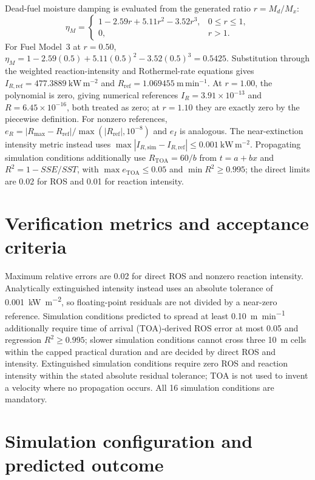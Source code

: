 Dead-fuel moisture damping is evaluated from the generated ratio
\(r=M_d/M_x\):
\[
 \eta_M=\begin{cases}
 1-2.59r+5.11r^2-3.52r^3,&0\leq r\leq1,\\
 0,&r>1.
 \end{cases}
\]
For Fuel Model~3 at \(r=0.50\),
\(\eta_M=1-2.59(0.5)+5.11(0.5)^2-3.52(0.5)^3=0.5425\).
Substitution through the weighted reaction-intensity and Rothermel-rate
equations gives
\(I_{R,\mathrm{ref}}=477.3889~\mathrm{kW\,m^{-2}}\) and
\(R_{\mathrm{ref}}=1.069455~\mathrm{m\,min^{-1}}\).
At \(r=1.00\), the polynomial is zero, giving numerical references
\(I_R=3.91\times10^{-13}\) and
\(R=6.45\times10^{-16}\), both treated as zero; at \(r=1.10\) they are
exactly zero by the piecewise definition.
For nonzero references,
\(e_R=|R_{\max}-R_{\mathrm{ref}}|/
\max(|R_{\mathrm{ref}}|,10^{-8})\) and \(e_I\) is analogous.
The near-extinction intensity metric instead uses
\(\max|I_{R,\mathrm{sim}}-I_{R,\mathrm{ref}}|
\leq0.001~\mathrm{kW\,m^{-2}}\).  Propagating simulation conditions additionally use
\(R_{\mathrm{TOA}}=60/b\) from \(t=a+bx\) and
\(R^2=1-SSE/SST\), with \(\max e_{\mathrm{TOA}}\leq0.05\) and
\(\min R^2\geq0.995\); the direct limits are 0.02 for ROS and 0.01 for
reaction intensity.

\section{Verification metrics and acceptance criteria}
Maximum relative errors are 0.02 for direct ROS and nonzero reaction intensity. Analytically extinguished intensity instead uses an absolute tolerance of \SI{0.001}{kW.m^{-2}}, so floating-point residuals are not divided by a near-zero reference.  Simulation conditions predicted to spread at least \SI{0.10}{m.min^{-1}} additionally require time of arrival (TOA)-derived ROS error at most 0.05 and regression $R^2\ge0.995$; slower simulation conditions cannot cross three \SI{10}{m} cells within the capped practical duration and are decided by direct ROS and intensity.  Extinguished simulation conditions require zero ROS and reaction intensity within the stated absolute residual tolerance; TOA is not used to invent a velocity where no propagation occurs.  All 16 simulation conditions are mandatory.

\section{Simulation configuration and predicted outcome}

